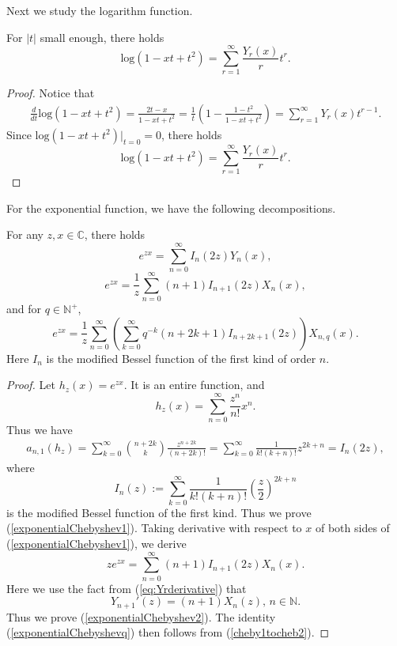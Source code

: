 \documentclass{article}
\begin{document}
Next we study the logarithm function.
\begin{lemma}\label{logarithm}
For $|t|$ small enough, there holds
\begin{equation}
    \mathrm{log}(1-xt+t^2)=\sum_{r=1}^{\infty}\frac{Y_r(x)}{r}t^{r}.
\end{equation}
\end{lemma}
\begin{proof}
Notice that
    \begin{equation}
\begin{aligned}
    \frac{d}{dt}\mathrm{log}(1-xt+t^2)=\frac{2t-x}{1-xt+t^2}=\frac{1}{t}\left(1-\frac{1-t^2}{1-xt+t^2}\right)=\sum_{r=1}^{\infty}Y_r(x)t^{r-1}.
\end{aligned}
\end{equation}
Since $\mathrm{log}(1-xt+t^2)|_{t=0}=0$, there holds
\begin{equation}
    \mathrm{log}(1-xt+t^2)=\sum_{r=1}^{\infty}\frac{Y_r(x)}{r}t^{r}.
\end{equation}
\end{proof}
For the exponential function, we have the following decompositions.
\begin{lemma}\label{exponential}
For any $z,x\in \mathbb{C}$, there holds
\begin{equation}\label{exponentialChebyshev1}
e^{zx}=\sum_{n=0}^{\infty}I_{n}(2z)Y_n(x),
\end{equation}
\begin{equation}\label{exponentialChebyshev2}
e^{zx}=\frac{1}{z}\sum_{n=0}^{\infty}(n+1)I_{n+1}(2z)X_n(x),
\end{equation}
and for $q\in \mathbb{N}^+$,
\begin{equation}\label{exponentialChebyshevq}
e^{zx}=\frac{1}{z}\sum_{n=0}^{\infty}\left(\sum_{k=0}^{\infty}q^{-k}(n+2k+1)I_{n+2k+1}(2z)\right) X_{n,q}(x).
\end{equation}
Here $I_n$ is the modified Bessel function of the first kind of order $n$.
\end{lemma}
\begin{proof}
    Let $h_z(x)=e^{zx}$. It is an entire function, and $$h_z(x)=\sum_{n=0}^{\infty}\frac{z^n}{n!}x^n.$$
    Thus we have 
    $$
    \begin{aligned}
        a_{n,1}(h_z)=\sum_{k=0}^{\infty} \binom{n+2k}{k}\frac{z^{n+2k}}{(n+2k)!}=\sum_{k=0}^{\infty} \frac{1}{k!(k+n)!}z^{2k+n}=I_{n}(2z),
    \end{aligned}
    $$
where 
\begin{equation}\label{Besselmodified1st}
    I_{n}(z):=\sum_{k=0}^{\infty} \frac{1}{k!(k+n)!}\left(\frac{z}{2}\right)^{2k+n} 
\end{equation}
is the modified Bessel function of the first kind. 
Thus we prove (\ref{exponentialChebyshev1}).
Taking derivative with respect to $x$ of both sides of (\ref{exponentialChebyshev1}), we derive 
$$ze^{zx}=\sum_{n=0}^{\infty}(n+1)I_{n+1}(2z)X_n(x).$$
Here we use the fact from (\ref{eq:Yrderivative}) that 
$$Y_{n+1}'(z)=(n+1)X_n(z), \,n\in \mathbb{N}.$$
Thus we prove (\ref{exponentialChebyshev2}). The identity (\ref{exponentialChebyshevq}) then follows from (\ref{cheby1tocheb2}).
\end{proof}
\end{document}
